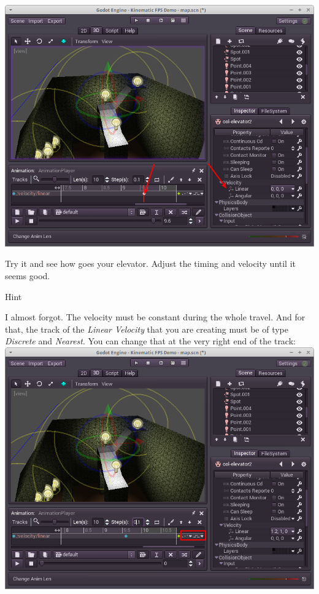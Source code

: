\documentclass[10pt,a4paper]{article}
\newenvironment{hint}{%
\begin{bclogo}[logo=\bcinfo, couleurBarre=Green, noborder=true, 
               couleur=white]{Hint}
}{%
\end{bclogo}\hspace{1px}\\
}
\begin{document}
\includegraphics[scale=0.45]{godot_step28.png}

Try it and see how goes your elevator. Adjust the timing and velocity until it seems good.
\begin{hint}
I almost forgot. The velocity must be constant during the whole travel. And for that, the track of the \textit{Linear Velocity} that you are creating must be of type \textit{Discrete} and \textit{Nearest}. You can change that at the very right end of the track:\\
\includegraphics[scale=0.45]{godot_step29.png}
\end{hint}
\end{document}
